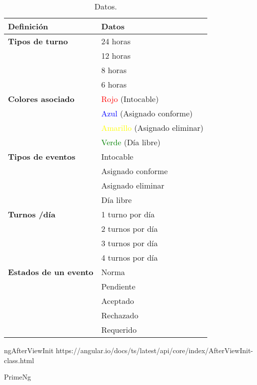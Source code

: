 \begin{itemize}
	\begin{table}[htbp]
\begin{center}
\begin{tabular}{|l|l|}
\hline
Definición & Datos  \\
\hline \hline
\textbf{Tipos de turno} &  24 horas \\ \hline
 &  12 horas \\ \hline
 &  8 horas\\ \hline
 &  6 horas\\ \hline
  \textbf{Colores asociado} & \textcolor{red}{Rojo} \small{(Intocable)} \\ \hline
 &  \textcolor{blue}{Azul} \small{(Asignado conforme)} \\ \hline
 &  \textcolor{yellow}{Amarillo} \small{(Asignado eliminar)} \\ \hline
 &  \textcolor{green}{Verde} \small{(Día libre)} \\ \hline
 \textbf{Tipos de eventos} & Intocable \\ \hline
 &  Asignado conforme \\ \hline
 &  Asignado eliminar \\ \hline
 &  Día libre\\ \hline
  \textbf{Turnos /día} & 1 turno por día \\ \hline
 & 2 turnos por día  \\ \hline
 & 3 turnos por día  \\ \hline
 & 4 turnos por día  \\ \hline
   \textbf{Estados de un evento} & Norma \\ \hline
 & Pendiente  \\ \hline
 & Aceptado   \\ \hline
 & Rechazado  \\ \hline
  & Requerido  \\ \hline
\end{tabular}
\caption{Datos.}
\label{tabla:sencilla}
\end{center}
\end{table}


	
\end{itemize}





ngAfterViewInit
https://angular.io/docs/ts/latest/api/core/index/AfterViewInit-class.html


PrimeNg

